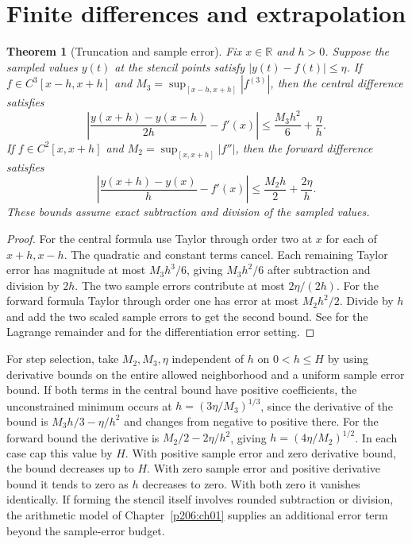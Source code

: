 \documentclass[11pt,oneside,openany]{book}
\theoremstyle{plain}
\newtheorem{theorem}{Theorem}[chapter]
\theoremstyle{definition}
\theoremstyle{remark}
\begin{document}
\section{Finite differences and extrapolation}

\begin{theorem}[Truncation and sample error]\label{p206:W60}
Fix \(x\in\mathbb R\) and \(h>0\). Suppose the sampled values
\(y(t)\) at the stencil points satisfy \(|y(t)-f(t)|\le\eta\).
If \(f\in C^3[x-h,x+h]\) and
\(M_3=\sup_{[x-h,x+h]}|f^{(3)}|\), then the central difference
satisfies
\[
 \left|\frac{y(x+h)-y(x-h)}{2h}-f'(x)\right|
       \le \frac{M_3h^2}{6}+\frac{\eta}{h}.
\]
If \(f\in C^2[x,x+h]\) and \(M_2=\sup_{[x,x+h]}|f''|\),
then the forward difference satisfies
\[
 \left|\frac{y(x+h)-y(x)}h-f'(x)\right|
       \le\frac{M_2h}{2}+\frac{2\eta}{h}.
\]
These bounds assume exact subtraction and division of the
sampled values.
\end{theorem}

\begin{proof}
For the central formula use Taylor through order two at \(x\)
for each of \(x+h,x-h\). The quadratic and constant terms
cancel. Each remaining Taylor error has magnitude at most
\(M_3h^3/6\), giving \(M_3h^2/6\) after subtraction and
division by \(2h\). The two sample errors contribute at most
\(2\eta/(2h)\). For the forward formula Taylor through
order one has error at most \(M_2h^2/2\). Divide by \(h\)
and add the two scaled sample errors to get the second bound.
See \cite[\texttt{K03.06.lagrange}]{d03} for the Lagrange
remainder and \cite[Section 5.5]{driscoll} for the
differentiation error setting.
\end{proof}

For step selection, take \(M_2,M_3,\eta\) independent of \(h\)
on \(0<h\le H\) by using derivative bounds on the entire
allowed neighborhood and a uniform sample error bound. If both
terms in the central bound have positive coefficients, the
unconstrained minimum occurs at \(h=(3\eta/M_3)^{1/3}\),
since the derivative of the bound is \(M_3h/3-\eta/h^2\)
and changes from negative to positive there. For the forward
bound the derivative is \(M_2/2-2\eta/h^2\), giving
\(h=(4\eta/M_2)^{1/2}\). In each case cap this value by \(H\).
With positive sample error and zero derivative bound, the bound
decreases up to \(H\). With zero sample error and positive
derivative bound it tends to zero as \(h\) decreases to zero.
With both zero it vanishes identically. If forming the stencil
itself involves rounded subtraction or division, the arithmetic
model of Chapter~\ref{p206:ch01} supplies an additional error
term beyond the sample-error budget.
\end{document}
